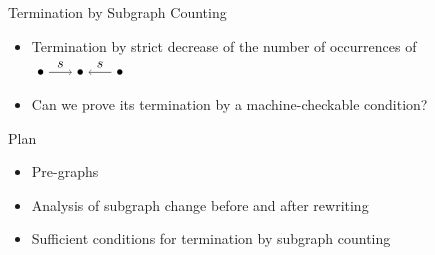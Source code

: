 \documentclass{beamer}
\newcommand{\graphbox}[8]{
  \begin{scope}[xshift=#2,yshift=#3]
    \draw [rounded corners=2mm] (0,0) rectangle (#4,-#5);
    \node at (0,0mm) [anchor=north west,inner sep=1mm] {#1};
    \begin{scope}[xshift=#4/2+#6,yshift=#7] 
    #8
    \end{scope}
  \end{scope}
}
\begin{document}
\begin{frame}{Termination by Subgraph Counting}
\begin{itemize}
{
            }
        \item  Termination by strict decrease of the number of occurrences of  $\tikz[baseline=-0.5ex]{ 
                \node (x) at (0,0) {$\bullet$}; 
                \node (y) at (1,0) {$\bullet$};
                \node (z) at (2,0) {$\bullet$};
                \draw[->] (x) -- (y) node[midway, above] {$s$};
                \draw[->] (z) -- (y) node[midway, above] {$s$};
        }$
        \item \alert{Can we prove its termination by a machine-checkable condition?}
    \end{itemize}
\end{frame}

\begin{frame}{Plan}
    \begin{itemize}
        \item Pre-graphs 
        \item Analysis of subgraph change before and after rewriting
        \item Sufficient conditions for termination by subgraph counting
    \end{itemize}
\end{frame}
\end{document}
